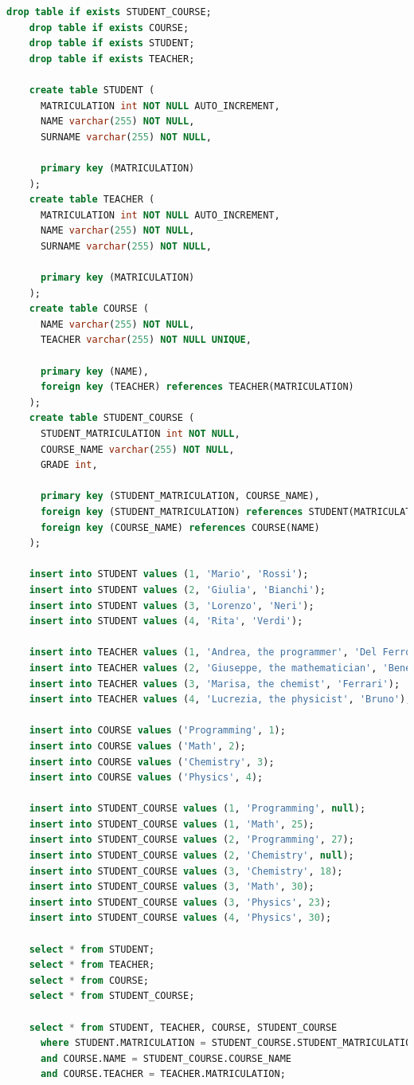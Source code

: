 \documentclass[12pt, a4paper]{article}
\begin{document}
  \begin{lstlisting}[language=sql, caption={Queries to initialize the DB}]
    drop table if exists STUDENT_COURSE;
    drop table if exists COURSE;
    drop table if exists STUDENT;
    drop table if exists TEACHER;
  
    create table STUDENT (
      MATRICULATION int NOT NULL AUTO_INCREMENT, 
      NAME varchar(255) NOT NULL, 
      SURNAME varchar(255) NOT NULL,
  
      primary key (MATRICULATION)
    );
    create table TEACHER (
      MATRICULATION int NOT NULL AUTO_INCREMENT, 
      NAME varchar(255) NOT NULL, 
      SURNAME varchar(255) NOT NULL,
  
      primary key (MATRICULATION)
    );
    create table COURSE (
      NAME varchar(255) NOT NULL, 
      TEACHER varchar(255) NOT NULL UNIQUE,
  
      primary key (NAME),
      foreign key (TEACHER) references TEACHER(MATRICULATION)
    );
    create table STUDENT_COURSE (
      STUDENT_MATRICULATION int NOT NULL, 
      COURSE_NAME varchar(255) NOT NULL,
      GRADE int,
  
      primary key (STUDENT_MATRICULATION, COURSE_NAME),
      foreign key (STUDENT_MATRICULATION) references STUDENT(MATRICULATION),
      foreign key (COURSE_NAME) references COURSE(NAME)
    );
  
    insert into STUDENT values (1, 'Mario', 'Rossi');
    insert into STUDENT values (2, 'Giulia', 'Bianchi');
    insert into STUDENT values (3, 'Lorenzo', 'Neri');
    insert into STUDENT values (4, 'Rita', 'Verdi');
  
    insert into TEACHER values (1, 'Andrea, the programmer', 'Del Ferro');
    insert into TEACHER values (2, 'Giuseppe, the mathematician', 'Benedetti');
    insert into TEACHER values (3, 'Marisa, the chemist', 'Ferrari');
    insert into TEACHER values (4, 'Lucrezia, the physicist', 'Bruno');
  
    insert into COURSE values ('Programming', 1);
    insert into COURSE values ('Math', 2);
    insert into COURSE values ('Chemistry', 3);
    insert into COURSE values ('Physics', 4);
  
    insert into STUDENT_COURSE values (1, 'Programming', null);
    insert into STUDENT_COURSE values (1, 'Math', 25);
    insert into STUDENT_COURSE values (2, 'Programming', 27);
    insert into STUDENT_COURSE values (2, 'Chemistry', null);
    insert into STUDENT_COURSE values (3, 'Chemistry', 18);
    insert into STUDENT_COURSE values (3, 'Math', 30);
    insert into STUDENT_COURSE values (3, 'Physics', 23);
    insert into STUDENT_COURSE values (4, 'Physics', 30);
  
    select * from STUDENT;
    select * from TEACHER;
    select * from COURSE;
    select * from STUDENT_COURSE;
  
    select * from STUDENT, TEACHER, COURSE, STUDENT_COURSE
      where STUDENT.MATRICULATION = STUDENT_COURSE.STUDENT_MATRICULATION
      and COURSE.NAME = STUDENT_COURSE.COURSE_NAME
      and COURSE.TEACHER = TEACHER.MATRICULATION;
  \end{lstlisting}
\end{document}

